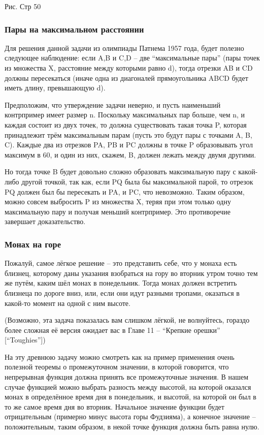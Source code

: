 Рис. Стр 50

\subsubsection*{Пары на максимальном расстоянии}%

Для решения данной задачи из олимпиады Патнема 1957 года, будет полезно следующее наблюдение: если A,B и C,D -- две “максимальные пары” (пары точек из множества X, расстояние между которыми равно d), тогда отрезки AB и CD должны пересекаться (иначе одна из диагоналей прямоугольника ABCD будет иметь длину, превышающую d).

Предположим, что утверждение задачи неверно, и пусть наименьший контрпример имеет размер n.
Поскольку максимальных пар больше, чем n, и каждая состоит из двух точек, то должна существовать такая точка P, которая принадлежит трём максимальным парам (пусть это будут пары с точками A, B, C).
Каждые два из отрезков PA, PB и PC должны в точке P образовывать угол максимум в 60, и один из них, скажем, B, должен лежать между двумя другими.


Но тогда точке B будет довольно сложно образовать максимальную пару с какой-либо другой точкой, так как, если PQ была бы максимальной парой, то отрезок PQ должен был бы пересекать и PA, и PC, что невозможно.
Таким образом, можно совсем выбросить P из множества X, теряя при этом только одну максимальную пару и получая меньший контрпример.
Это противоречие завершает доказательство.

\subsubsection*{Монах на горе}%

Пожалуй, самое лёгкое решение -- это представить себе, что у монаха есть близнец, которому даны указания взобраться на гору во вторник утром точно тем же путём, каким шёл монах в понедельник.
Тогда монах должен встретить близнеца по дороге вниз, или, если они идут разными тропами, оказаться в какой-то момент на одной с ним высоте.

(Возможно, эта задача показалась вам слишком лёгкой, не волнуйтесь, гораздо более сложная её версия ожидает вас в Главе 11 -- “Крепкие орешки” [“Toughies”])

На эту древнюю задачу можно смотреть как на пример применения очень полезной теоремы о промежуточном значении, в которой говорится, что непрерывная функция должна принять все промежуточные значения.
В нашем случае функцией можно выбрать разность между высотой, на которой оказался монах в определённое время дня в понедельник, и высотой, на которой он был в то же самое время дня во вторник.
Начальное значение функции будет отрицательным (примерно минус высота горы Фудзияма), а конечное значение -- положительным, таким образом, в некой точке функция должна быть равна нулю.

